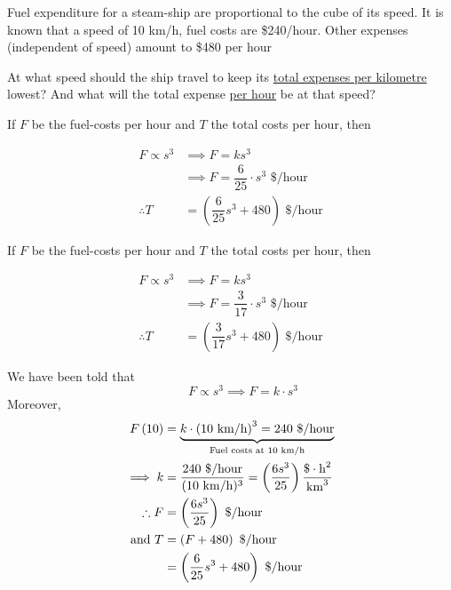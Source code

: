 \documentclass[14pt,fleqn]{extarticle}
\newcommand\dph{\text{ \$/hour}}
\newcommand\kmph{\text{ km/h}}
\newcommand\konst{\left( \frac{6s^3}{25} \right)}
\begin{document}
\begin{problem}
\statement
	
Fuel expenditure for a steam-ship are
proportional to the cube of its speed. It is
known that a speed of 10 km/h, fuel costs
are \$240/hour. Other expenses (independent
of speed) amount to \$480 per hour \newline 

At what speed should the ship travel  to keep
its \underline{total expenses per kilometre} lowest? And 
what will the total expense \underline{per hour} be at that speed? 
%
\begin{step}
	\begin{options}
		\correct
      
      If $F$ be the fuel-costs per hour and $T$ the total costs per hour, then 
		
      \begin{align}
        F \propto s^3 &\implies F = ks^3 \\
        &\implies F =  \dfrac{6}{25}\cdot s^3 \dph    \\
        \therefore T &= \left(\dfrac{6}{25}s^3 + 480\right) \dph 
      \end{align}
      

		\incorrect

If $F$ be the fuel-costs per hour and $T$ the total costs per hour, then 
		
      \begin{align}
        F \propto s^3 &\implies F = ks^3 \\
        &\implies F =  \dfrac{3}{17}\cdot s^3 \dph    \\
        \therefore T &= \left(\dfrac{3}{17}s^3 + 480\right) \dph 
      \end{align}

	\end{options}
	\reason

	We have been told that 
	\[\qquad F \propto s^3 \implies F =k\cdot s^3  \]
	Moreover, 
      \begin{align}
        F \left(10 \right) &= \underbrace{k\cdot \left(10 \kmph \right)^3 = 240 \dph}_{\text{Fuel costs at 10\kmph}} \\
        \implies k &= \dfrac{240\dph}{(10 \kmph)^3} = 
        \konst \frac{\$\cdot \text{h}^2}{\text{km}^3}\\
        \therefore F &= \konst\dph \\
        \text{and } T &= \left( F+480\right) \dph \\
        &=\left(\dfrac{6}{25}s^3 + 480\right) \dph
      \end{align}
    

\end{step}
\end{problem}
\end{document}
